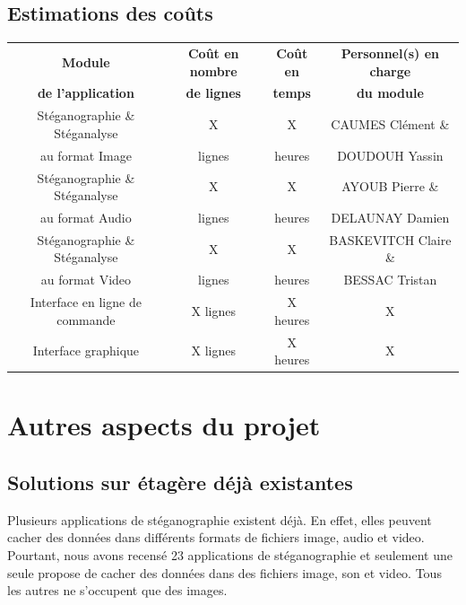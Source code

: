 \documentclass[11pt]{article}
\begin{document}
\subsection{Estimations des coûts}
\begin{tabular}{|c|c|c|c|}
  \hline
  \textbf{Module} & \textbf{Coût en nombre} & \textbf{Coût en} & \textbf{Personnel(s) en charge} \\
   \textbf{de l'application} & \textbf{de lignes} & \textbf{temps} & \textbf{du module} \\
  \hline
  Stéganographie \& Stéganalyse & X & X & CAUMES Clément \&\\
   au format Image & lignes & heures & DOUDOUH Yassin\\
  \hline
  Stéganographie \& Stéganalyse & X & X & AYOUB Pierre \&\\
   au format Audio & lignes & heures & DELAUNAY Damien\\
  \hline
  Stéganographie \& Stéganalyse & X & X & BASKEVITCH Claire \&\\
   au format Video & lignes & heures & BESSAC Tristan\\
  \hline
  Interface en ligne de commande & X lignes & X heures & X\\ 
  \hline
  Interface graphique & X lignes & X heures & X\\
  \hline
\end{tabular}

\section{Autres aspects du projet}
\subsection{Solutions sur étagère déjà existantes}
Plusieurs applications de stéganographie existent déjà. En effet, elles peuvent cacher des données dans différents formats de fichiers image, audio et video. 
Pourtant, nous avons recensé 23 applications de stéganographie et seulement une seule propose de cacher des données dans des fichiers image, son et video. 
Tous les autres ne s'occupent que des images. 
\end{document}
